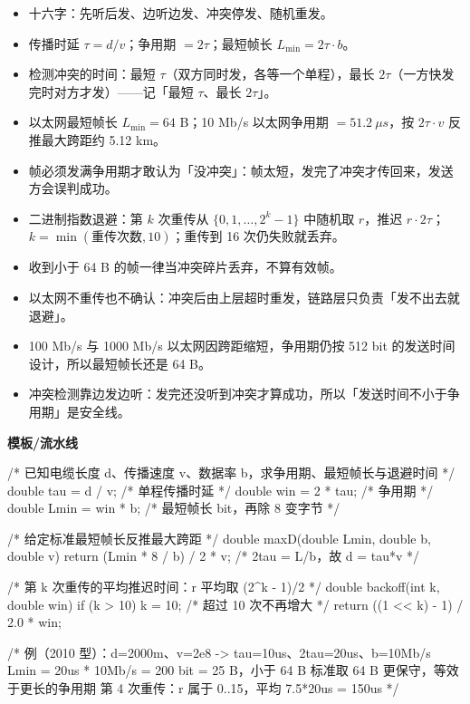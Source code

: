 \documentclass[10pt,a4paper]{ctexart}
\begin{document}
\begin{itemize}

\item 十六字：先听后发、边听边发、冲突停发、随机重发。

\item 传播时延 $\tau = d/v$；争用期 $= 2\tau$；最短帧长 $L_{\min} = 2\tau \cdot b$。

\item 检测冲突的时间：最短 $\tau$（双方同时发，各等一个单程），最长 $2\tau$（一方快发完时对方才发）——记「最短 $\tau$、最长 $2\tau$」。

\item 以太网最短帧长 $L_{\min} = 64$ B；10 Mb/s 以太网争用期 $= 51.2\ \mu s$，按 $2\tau \cdot v$ 反推最大跨距约 5.12 km。

\item 帧必须发满争用期才敢认为「没冲突」：帧太短，发完了冲突才传回来，发送方会误判成功。

\item 二进制指数退避：第 $k$ 次重传从 $\{0,1,\ldots,2^{k}-1\}$ 中随机取 $r$，推迟 $r \cdot 2\tau$；$k = \min(\text{重传次数}, 10)$；重传到 16 次仍失败就丢弃。

\item 收到小于 64 B 的帧一律当冲突碎片丢弃，不算有效帧。

\item 以太网不重传也不确认：冲突后由上层超时重发，链路层只负责「发不出去就退避」。

\item 100 Mb/s 与 1000 Mb/s 以太网因跨距缩短，争用期仍按 512 bit 的发送时间设计，所以最短帧长还是 64 B。

\item 冲突检测靠边发边听：发完还没听到冲突才算成功，所以「发送时间不小于争用期」是安全线。

\end{itemize}


\textbf{模板/流水线}

\begin{codebox}
/* 已知电缆长度 d、传播速度 v、数据率 b，求争用期、最短帧长与退避时间 */
double tau  = d / v;               /* 单程传播时延 */
double win  = 2 * tau;             /* 争用期 */
double Lmin = win * b;             /* 最短帧长 bit，再除 8 变字节 */

/* 给定标准最短帧长反推最大跨距 */
double maxD(double Lmin, double b, double v) {
    return (Lmin * 8 / b) / 2 * v; /* 2tau = L/b，故 d = tau*v */
}

/* 第 k 次重传的平均推迟时间：r 平均取 (2^k - 1)/2 */
double backoff(int k, double win) {
    if (k > 10) k = 10;            /* 超过 10 次不再增大 */
    return ((1 << k) - 1) / 2.0 * win;
}

/* 例（2010 型）：d=2000m、v=2e8 -> tau=10us、2tau=20us、b=10Mb/s
   Lmin = 20us * 10Mb/s = 200 bit = 25 B，小于 64 B
   标准取 64 B 更保守，等效于更长的争用期
   第 4 次重传：r 属于 0..15，平均 7.5*20us = 150us */
\end{codebox}
\end{document}
